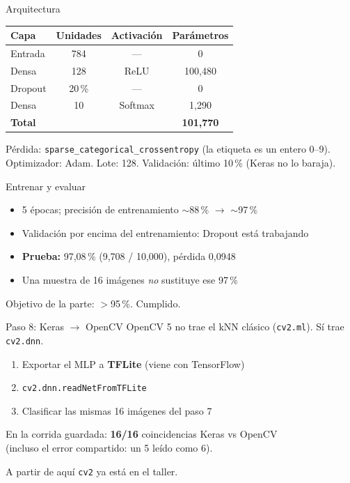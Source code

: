\documentclass[aspectratio=169]{beamer}
\begin{document}
\begin{frame}{Arquitectura}
  \begin{tabular}{@{}lccc@{}}
    \toprule
    Capa & Unidades & Activación & Parámetros \\
    \midrule
    Entrada & 784 & --- & 0 \\
    Densa & 128 & ReLU & 100{,}480 \\
    Dropout & 20\,\% & --- & 0 \\
    Densa & 10 & Softmax & 1{,}290 \\
    \midrule
    \textbf{Total} & & & \textbf{101{,}770} \\
    \bottomrule
  \end{tabular}

  \vspace{0.8em}
  Pérdida: \texttt{sparse\_categorical\_crossentropy} (la etiqueta es un entero 0--9).\\
  Optimizador: Adam. Lote: 128. Validación: último 10\,\% (Keras no lo baraja).
\end{frame}

\begin{frame}{Entrenar y evaluar}
  \begin{itemize}
    \item 5 épocas; precisión de entrenamiento $\sim$88\,\% $\to$ $\sim$97\,\%
    \item Validación por encima del entrenamiento: Dropout está trabajando
    \item \textbf{Prueba:} 97{,}08\,\% (9{,}708 / 10{,}000), pérdida 0{,}0948
    \item Una muestra de 16 imágenes \emph{no} sustituye ese 97\,\%
  \end{itemize}

  Objetivo de la parte: $>$95\,\%. Cumplido.
\end{frame}

\begin{frame}{Paso 8: Keras $\to$ OpenCV}
  OpenCV 5 no trae el kNN clásico (\texttt{cv2.ml}). Sí trae \texttt{cv2.dnn}.

  \begin{enumerate}
    \item Exportar el MLP a \textbf{TFLite} (viene con TensorFlow)
    \item \texttt{cv2.dnn.readNetFromTFLite}
    \item Clasificar las mismas 16 imágenes del paso 7
  \end{enumerate}

  En la corrida guardada: \textbf{16/16} coincidencias Keras vs OpenCV\\
  (incluso el error compartido: un 5 leído como 6).

  A partir de aquí \texttt{cv2} ya está en el taller.
\end{frame}
\end{document}
